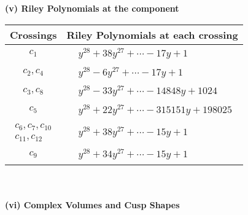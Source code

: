 \documentclass[1p]{elsarticle_modified}
\theoremstyle{definition}
\begin{document}
\newpage\renewcommand{\arraystretch}{1}
\flushleft \textbf{(v) Riley Polynomials at the component}\newline \\
\begin{tabular}{m{50pt}|m{274pt}}
Crossings & \hspace{64pt}Riley Polynomials at each crossing \\
\hline $$\begin{aligned}c_{1}\end{aligned}$$&$\begin{aligned}
&y^{28}+38 y^{27}+\cdots-17 y+1
\end{aligned}$\\
\hline $$\begin{aligned}c_{2},c_{4}\end{aligned}$$&$\begin{aligned}
&y^{28}-6 y^{27}+\cdots-17 y+1
\end{aligned}$\\
\hline $$\begin{aligned}c_{3},c_{8}\end{aligned}$$&$\begin{aligned}
&y^{28}-33 y^{27}+\cdots-14848 y+1024
\end{aligned}$\\
\hline $$\begin{aligned}c_{5}\end{aligned}$$&$\begin{aligned}
&y^{28}+22 y^{27}+\cdots-315151 y+198025
\end{aligned}$\\
\hline $$\begin{aligned}c_{6},c_{7},c_{10}\\c_{11},c_{12}\end{aligned}$$&$\begin{aligned}
&y^{28}+38 y^{27}+\cdots-15 y+1
\end{aligned}$\\
\hline $$\begin{aligned}c_{9}\end{aligned}$$&$\begin{aligned}
&y^{28}+34 y^{27}+\cdots-15 y+1
\end{aligned}$\\
\hline
\end{tabular}\\~\\
\newpage\flushleft \textbf{(vi) Complex Volumes and Cusp Shapes}
\end{document}
